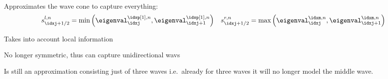 \begin{defnbox}\nospacing
    \begin{defn}\label{defn:hll_original}\leavevmode\\
        Approximates the wave cone to capture everything:
        \begin{align}
          s_{\idxj+1/2}^{l,n}=\min\left(\eigenval_{\idxj}^{\idxp[1],n},\eigenval_{\idxj+1}^{\idxp[1],n}\right)&&
          s_{\idxj+1/2}^{r,n}=\max\left(\eigenval_{\idxj}^{\idxm,n},\eigenval_{\idxj+1}^{\idxm,n}\right)
        \end{align}
    \end{defn}
\end{defnbox}
\begin{sectionbox}\nospacing
    \begin{minipage}[t]{0.4\textwidth}
       \begin{proslist}
           \item Takes into account local information
           \item No longer symmetric, thus can capture unidirectional wavs
       \end{proslist}
    \end{minipage}
    \begin{minipage}[t]{0.55\textwidth}
       \begin{conslist}
           \item Is still an approximation consisting just of three waves i.e.\ already for
           three waves it will no longer model the middle wave.
       \end{conslist}
    \end{minipage}
\end{sectionbox}
